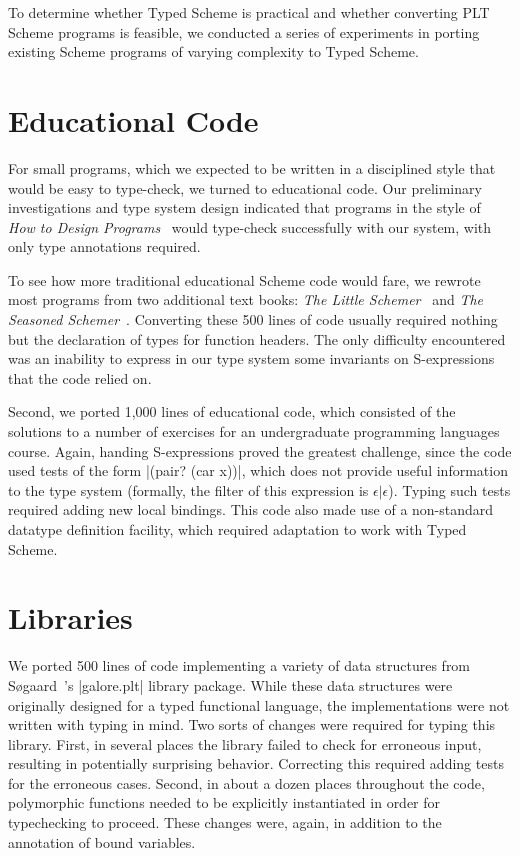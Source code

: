 \begin{schemeregion}
\label{chap:exp}

To determine whether Typed Scheme is practical and whether converting
PLT Scheme programs is feasible, we conducted a series of experiments
in porting existing Scheme programs of varying complexity to Typed
Scheme.

\section{Educational Code}
For small programs, which we expected to be written in a disciplined
style that would be easy to type-check, we turned to educational
code.  Our preliminary investigations and type system design indicated
that programs in the style of {\it How to Design Programs}~\cite{fffk:htdp}
would type-check successfully with our system, with only type
annotations required.  

To see how more traditional educational Scheme code would fare, we
rewrote most programs from  two additional text books: {\it The Little
  Schemer\/}~\cite{little-schemer} and {\it The Seasoned
  Schemer\/}~\cite{seasoned-schemer}.  Converting
these 500 lines of code usually required nothing but the declaration
of types for function headers.  The only difficulty encountered was
 an inability to express in our type system some
invariants on S-expressions that the code relied on.

Second, we ported 1,000 lines of educational code, which consisted of
the solutions to a number of exercises for an undergraduate
programming languages course.  Again, handing S-expressions proved the
greatest challenge, since the code used tests of the form
\scheme|(pair? (car x))|, which does not provide useful information to
the type system (formally, the filter of this expression is
$\epsilon|\epsilon$).  Typing such tests required adding new local bindings.
This code also made use of a non-standard datatype definition
facility, which required adaptation to work with Typed Scheme.

\section{Libraries}
We ported 500 lines of code implementing a variety of data
structures from S\o gaard~\nocite{galore}'s
\scheme|galore.plt| library package. While these data structures were
originally designed for a typed functional language, the
implementations were not written with typing in mind. Two sorts of
changes were required for typing this library. First, in several
places the library failed to check for erroneous input, resulting in potentially surprising
behavior.  Correcting this required adding tests for the erroneous
cases.  Second, in about a dozen places throughout the code,
polymorphic functions needed to be explicitly instantiated in order
for typechecking to proceed.  These changes were, again, in addition
to the annotation of bound variables.


\end{schemeregion}
